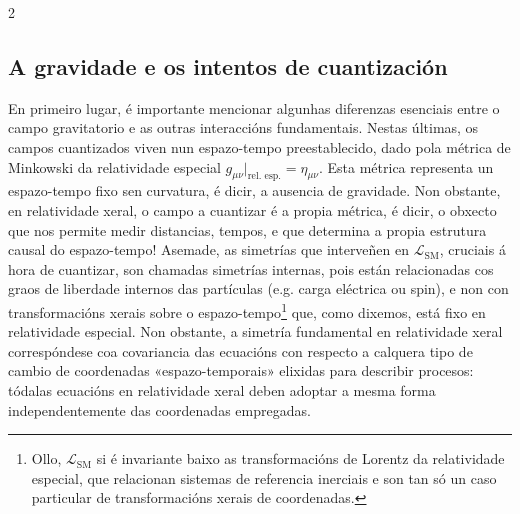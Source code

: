 \begin{multicols}{2}
\subsection*{A gravidade e os intentos de cuantización}

En primeiro lugar, é importante mencionar algunhas diferenzas esenciais entre o
campo gravitatorio e as outras interaccións fundamentais. Nestas últimas, os
campos cuantizados viven nun espazo-tempo preestablecido, dado pola métrica de %
Minkowski da relatividade especial $g_{\mu \nu}|_{\text{rel. esp.}} = \eta_{\mu
\nu}$. Esta métrica representa un espazo-tempo fixo sen curvatura, é dicir, a
ausencia de gravidade. Non obstante, en relatividade xeral, o campo a cuantizar
é a propia métrica, é dicir, o obxecto que nos permite medir distancias,
tempos, e que determina a propia estrutura causal do espazo-tempo! Asemade, as %
simetrías que interveñen en $\mathcal{L}_\text{SM}$, cruciais á hora de
cuantizar, son chamadas simetrías internas, pois están relacionadas cos graos
de liberdade internos das partículas (e.g. carga eléctrica ou spin),
e non con transformacións xerais sobre o espazo-tempo\footnote{Ollo,
$\mathcal{L}_\text{SM}$ si é invariante baixo as transformacións de Lorentz da
relatividade especial, que relacionan sistemas de referencia inerciais e son
tan só un caso particular de transformacións xerais de coordenadas.} que, como
dixemos, está fixo en relatividade especial. Non obstante, a simetría
fundamental en relatividade xeral correspóndese coa covariancia das ecuacións
con respecto a calquera tipo de cambio de coordenadas «espazo-temporais»
elixidas para describir procesos: tódalas ecuacións en relatividade xeral %
deben adoptar a mesma forma independentemente das coordenadas empregadas.


\end{multicols}
